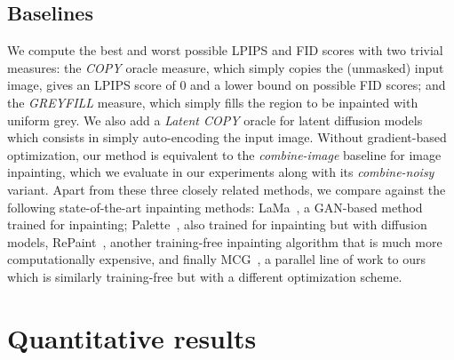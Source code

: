\subsection{Baselines}  We compute the best and worst possible LPIPS and FID scores with two trivial measures: 
the \textit{COPY} oracle measure, which simply copies the (unmasked) input image, gives an LPIPS score of $0$ and a lower bound on 
possible FID scores; and the \textit{GREYFILL} measure, which simply fills the region to be inpainted with uniform grey. 
We also add a \textit{Latent COPY} oracle for latent diffusion models which consists in simply auto-encoding the input image.
Without
 gradient-based optimization, our method is equivalent to the \textit{combine-image} baseline for image inpainting, which we evaluate 
 in our experiments along with its \textit{combine-noisy} variant. Apart from these three closely related methods, we compare against
  the following state-of-the-art inpainting methods:  LaMa~\citep{lama}, a GAN-based method trained for inpainting; 
  Palette~\citep{saharia2022palette}, also trained for inpainting but with diffusion models, RePaint~\citep{lugmayr2022repaint}, another
   training-free inpainting algorithm that is much more computationally expensive, and finally MCG~\citep{mcg}, a parallel line 
   of work to ours which is similarly training-free but with a different optimization scheme. 


\section{Quantitative results}


